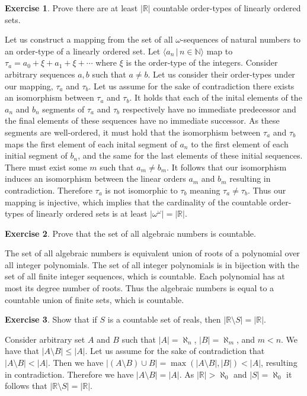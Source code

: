 \documentclass{article}
\theoremstyle{definition}
\newtheorem{exer}{Exercise}[section]
\newcommand{\N}{\mathbb{N}}
\newcommand{\R}{\mathbb{R}}
\newcommand{\abs}[1]{\lvert#1\rvert}
\newlength{\defparindent}
\newenvironment{answer}
    {\begin{mdframed}[backgroundcolor=gray!15, linewidth=0pt] \setlength{\parindent}{\defparindent}}
    {\end{mdframed}}
\begin{document}
\begin{exer}
    Prove there are at least $\abs{\R}$ countable order-types of linearly ordered sets.
    \begin{answer}
        Let us construct a mapping from the set of all $\omega$-sequences of natural numbers to an order-type of a linearly ordered set. Let $\langle a_n \, | \, n \in \N \rangle$ map to $\tau_a = a_0 + \xi + a_1 + \xi + \cdots$ where $\xi$ is the order-type of the integers. Consider arbitrary sequences $a, b$ such that $a \ne b$. Let us consider their order-types under our mapping, $\tau_a$ and $\tau_b$. Let us assume for the sake of contradiction there exists an isomorphism between $\tau_a$ and $\tau_b$. It holds that each of the inital elements of the $a_n$ and $b_n$ segments of $\tau_a$ and $\tau_b$ respectively have no immediate predecessor and the final elements of these sequences have no immediate successor. As these segments are well-ordered, it must hold that the isomorphism between $\tau_a$ and $\tau_b$ maps the first element of each inital segment of $a_n$ to the first element of each initial segment of $b_n$, and the same for the last elements of these initial sequences. There must exist some $m$ such that $a_m \ne b_m$. It follows that our isomorphism induces an isomorphism between the linear orders $a_m$ and $b_m$ resulting in contradiction. Therefore $\tau_a$ is not isomorphic to $\tau_b$ meaning $\tau_a \ne \tau_b$. Thus our mapping is injective, which implies that the cardinality of the countable order-types of linearly ordered sets is at least $\abs{\omega^\omega} = \abs{\R}$.
    \end{answer}
\end{exer}

\begin{exer}
    Prove that the set of all algebraic numbers is countable.
    \begin{answer}
        The set of all algebraic numbers is equivalent union of roots of a polynomial over all integer polynomials. The set of all integer polynomials is in bijection with the set of all finite integer sequences, which is countable. Each polynomial has at most its degree number of roots. Thus the algebraic numbers is equal to a countable union of finite sets, which is countable.
    \end{answer}
\end{exer}

\begin{exer}
    Show that if $S$ is a countable set of reals, then $\abs{\R \setminus S} = \abs{\R}$.
    \begin{answer}
        Consider arbitrary set $A$ and $B$ such that $\abs{A} = \aleph_n$, $\abs{B} = \aleph_m$, and $m < n$. We have that $\abs{A \setminus B}  \le \abs{A}$. Let us assume for the sake of contradiction that $\abs{A \setminus B} < \abs{A}$. Then we have $\abs{(A \setminus B) \cup B} = \max(\abs{A \setminus B}, \abs{B}) < \abs{A}$, resulting in contradiction. Therefore we have $\abs{A \setminus B} = \abs{A}$. As $\abs{\R} > \aleph_0$ and $\abs{S} = \aleph_0$ it follows that $\abs{\R \setminus S} = \abs{\R}$.
    \end{answer}
\end{exer}
\end{document}

